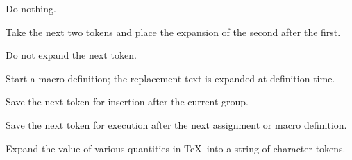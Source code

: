 \documentclass[twoside,letterpaper,openright]{rapport3}
\begin{document}
\label{cschap:relax}\label{cschap:expandafter}\label{cschap:noexpand}\label{cschap:afterassignment}\label{cschap:the}
\begin{inventory}
\item [\cs{relax}] 
     Do nothing.


\item [\cs{expandafter}]  
      Take the next two tokens and place the expansion of the
      second after the first.

\item [\cs{noexpand}]   
      Do not expand the next token.


\item [\cs{edef}] 
      Start a macro definition; 
      the replacement text is expanded at definition time.

% 
 
\item [\cs{aftergroup}]  
      Save the next token for insertion after the current group.

\item [\cs{afterassignment}]   
      Save the next token for execution after the next assignment
      or macro definition.


\item [\cs{the}] 
      Expand the value of various quantities in \TeX\ into a string
      of character tokens.

\end{inventory}
\end{document}
